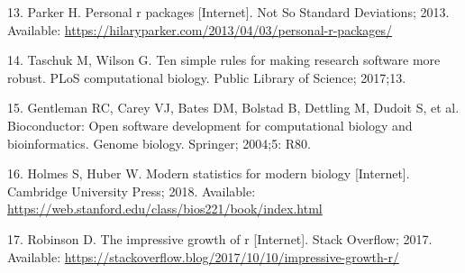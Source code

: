 \documentclass[10pt,letterpaper]{article}
\begin{document}
\leavevmode\hypertarget{ref-parker2013}{}%
13. Parker H. Personal r packages {[}Internet{]}. Not So Standard
Deviations; 2013. Available:
\url{https://hilaryparker.com/2013/04/03/personal-r-packages/}

\leavevmode\hypertarget{ref-taschuk2017}{}%
14. Taschuk M, Wilson G. Ten simple rules for making research software
more robust. PLoS computational biology. Public Library of Science;
2017;13.

\leavevmode\hypertarget{ref-gentleman2004}{}%
15. Gentleman RC, Carey VJ, Bates DM, Bolstad B, Dettling M, Dudoit S,
et al. Bioconductor: Open software development for computational biology
and bioinformatics. Genome biology. Springer; 2004;5: R80.

\leavevmode\hypertarget{ref-holmes2018}{}%
16. Holmes S, Huber W. Modern statistics for modern biology
{[}Internet{]}. Cambridge University Press; 2018. Available:
\url{https://web.stanford.edu/class/bios221/book/index.html}

\leavevmode\hypertarget{ref-robinson2017}{}%
17. Robinson D. The impressive growth of r {[}Internet{]}. Stack
Overflow; 2017. Available:
\url{https://stackoverflow.blog/2017/10/10/impressive-growth-r/}

\nolinenumbers
\end{document}
